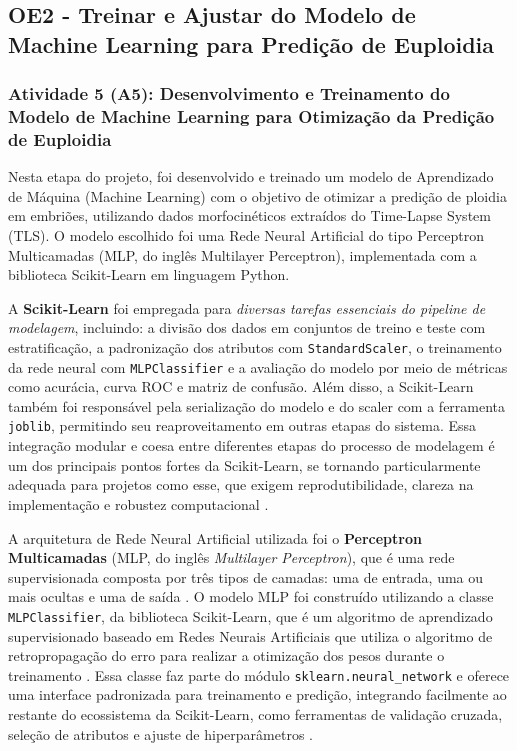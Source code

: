 \subsection{OE2 - Treinar e Ajustar do Modelo de Machine Learning para Predição de Euploidia}
\subsubsection{Atividade 5 (A5): Desenvolvimento e Treinamento do Modelo de Machine Learning para Otimização da Predição de Euploidia}
Nesta etapa do projeto, foi desenvolvido e treinado um modelo de Aprendizado de Máquina (Machine Learning) com o objetivo de otimizar a predição de ploidia em embriões, utilizando dados morfocinéticos extraídos do Time-Lapse System (TLS). O modelo escolhido foi uma Rede Neural Artificial do tipo Perceptron Multicamadas (MLP, do inglês Multilayer Perceptron), implementada com a biblioteca Scikit-Learn em linguagem Python.

A \textbf{Scikit-Learn} foi empregada para \textit{diversas tarefas essenciais do pipeline de modelagem}, incluindo: a divisão dos dados em conjuntos de treino e teste com estratificação, a padronização dos atributos com \texttt{StandardScaler}, o treinamento da rede neural com \texttt{MLPClassifier} e a avaliação do modelo por meio de métricas como acurácia, curva ROC e matriz de confusão. Além disso, a Scikit-Learn também foi responsável pela serialização do modelo e do scaler com a ferramenta \texttt{joblib}, permitindo seu reaproveitamento em outras etapas do sistema. Essa integração modular e coesa entre diferentes etapas do processo de modelagem é um dos principais pontos fortes da Scikit-Learn, se tornando particularmente adequada para projetos como esse, que exigem reprodutibilidade, clareza na implementação e robustez computacional \cite{geron2017}.

A arquitetura de Rede Neural Artificial utilizada foi o \textbf{Perceptron Multicamadas} (MLP, do inglês \textit{Multilayer Perceptron}), que é uma rede supervisionada composta por três tipos de camadas: uma de entrada, uma ou mais ocultas e uma de saída \cite{haykin2009}. O modelo MLP foi construído utilizando a classe \texttt{MLPClassifier}, da biblioteca Scikit-Learn, que é um algoritmo de aprendizado supervisionado baseado em Redes Neurais Artificiais que utiliza o algoritmo de retropropagação do erro para realizar a otimização dos pesos durante o treinamento \cite{geron2017}.  Essa classe faz parte do módulo \texttt{sklearn.neural\_network} e oferece uma interface padronizada para treinamento e predição, integrando facilmente ao restante do ecossistema da Scikit-Learn, como ferramentas de validação cruzada, seleção de atributos e ajuste de hiperparâmetros \cite{geron2017}. 

